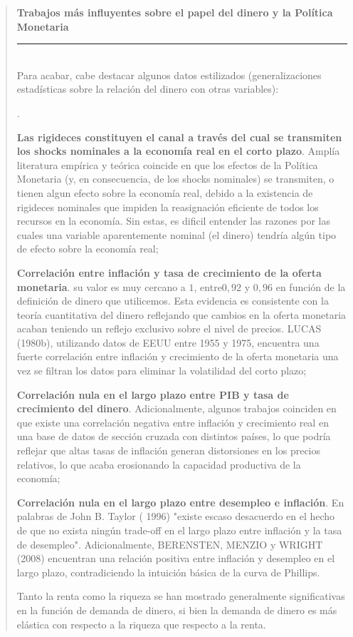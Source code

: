 \documentclass[10pt,a4paper]{article}
\newcounter{numitem}
\newenvironment{lnum}
      {\begin{list}{\arabic{numitem}.}{%
          \usecounter{numitem}%
          \setlength{\leftmargin}{1cm}%
          \setlength{\parskip}{3pt}%
          \setlength{\itemsep}{0pt}%
          \setlength{\parsep}{0pt}%
      }}
      {\end{list}}
\newenvironment{specialblock}[1]{%
      \begin{quote} %
      \small %
      \noindent\textbf{#1}\\[-0.3em] %
      \rule{\linewidth}{0.4pt}\\[0.6em]}{
      \end{quote}}
\begin{document}
\begin{specialblock}{Trabajos más influyentes sobre el papel del dinero y la Política Monetaria}
    Para acabar, cabe destacar algunos datos estilizados (generalizaciones estadísticas sobre la relación del dinero con otras variables):
    \begin{lnum}
        \item \textbf{Las rigideces constituyen el canal a través del cual se transmiten los shocks nominales a la economía real en el corto plazo}. Amplía literatura empírica y teórica coincide en que los efectos de la Política Monetaria (y, en consecuencia, de los shocks nominales) se transmiten, o tienen algun efecto sobre la economía real, debido a la existencia de rigideces nominales que impiden la reasignación eficiente de todos los recursos en la economía. Sin estas, es dificil entender las razones por las cuales una variable aparentemente nominal (el dinero) tendría algún tipo de efecto sobre la economía real;
        \item \textbf{Correlación entre inflación y tasa de crecimiento de la oferta monetaria}. su valor es muy cercano a $1$, entre$ 0,92$ y $0,96$ en función de la definición de dinero que utilicemos. Esta evidencia es consistente con la teoría cuantitativa del dinero reflejando que cambios en la oferta monetaria acaban teniendo un reflejo exclusivo sobre el nivel de precios. LUCAS (1980b), utilizando datos de EEUU entre 1955 y 1975, encuentra una fuerte correlación entre inflación y crecimiento de la oferta monetaria una vez se filtran los datos para eliminar la volatilidad del corto plazo;
        \item \textbf{Correlación nula en el largo plazo entre PIB y tasa de crecimiento del dinero}. Adicionalmente, algunos trabajos coinciden en que existe una correlación negativa entre inflación y crecimiento real en una base de datos de sección cruzada con distintos países, lo que podría reflejar que altas tasas de inflación generan distorsiones en los precios relativos, lo que acaba erosionando la capacidad productiva de la economía;
        \item \textbf{Correlación nula en el largo plazo entre desempleo e inflación}. En palabras de John B. Taylor ( 1996) "existe escaso desacuerdo en el hecho de que no exista ningún trade-off en el largo plazo entre inflación y la tasa de desempleo". Adicionalmente, BERENSTEN, MENZIO y WRIGHT (2008) encuentran una relación positiva entre inflación y desempleo en el largo plazo, contradiciendo la intuición básica de la curva de Phillips.
        \item Tanto la renta como la riqueza se han mostrado generalmente significativas en la función de demanda de dinero, si bien la demanda de dinero es más elástica con respecto a la riqueza que respecto a la renta. 

\end{lnum}
\end{specialblock}
\end{document}
